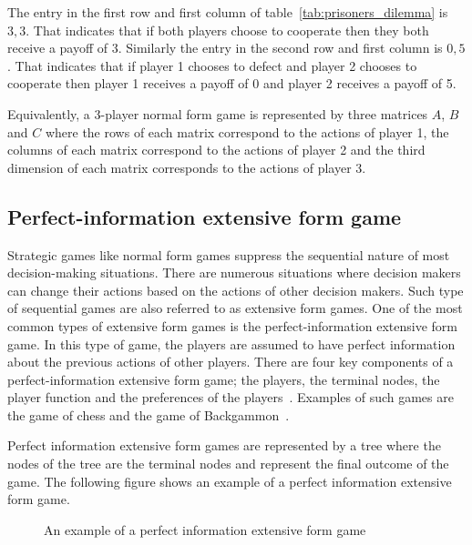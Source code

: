 The entry in the first row and first column of table~\ref{tab:prisoners_dilemma}
is \(3,3\).
That indicates that if both players choose to cooperate then they both receive
a payoff of 3.
Similarly the entry in the second row and first column is \(0,5\).
That indicates that if player 1 chooses to defect and player 2 chooses to
cooperate then player 1 receives a payoff of 0 and player 2 receives a payoff
of 5.

Equivalently, a 3-player normal form game is represented by three matrices
\(A\), \(B\) and \(C\) where the rows of each matrix correspond to the actions
of player 1, the columns of each matrix correspond to the actions of player 2
and the third dimension of each matrix corresponds to the actions of player 3.




\subsection{Perfect-information extensive form game}

Strategic games like normal form games suppress the sequential nature of most
decision-making situations.
There are numerous situations where decision makers can change their actions
based on the actions of other decision makers.
Such type of sequential games are also referred to as extensive form games.
One of the most common types of extensive form games is the perfect-information
extensive form game.
In this type of game, the players are assumed to have perfect information
about the previous actions of other
players.
There are four key components of a perfect-information extensive form game; the
players, the terminal nodes, the player function and the preferences of the
players~\cite{osborne2004_extensive_form_games}.
Examples of such games are the game of chess and the game of
Backgammon~\cite{hart1992games}.

Perfect information extensive form games are represented by a tree where the
nodes of the tree are the terminal nodes and represent the final outcome of the
game.
The following figure shows an example of a perfect information extensive form
game.

\begin{figure}[H]
    \centering
    
    \caption{An example of a perfect information extensive form game}
    \label{fig:extensive_form_game}
\end{figure}

